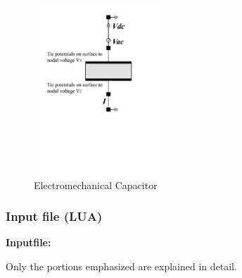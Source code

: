 \begin{figure}[htbp]
\centering
\includegraphics[trim = 1in 3.5in 2in 0.5in, clip, height = 2.5in]{fig/em_capacitor.pdf}
\caption{Electromechanical Capacitor}
\end{figure}

\clearpage
\subsubsection*{Input file (LUA)}
\begin{flushleft}
  \textbf{Inputfile:}
  \\
\end{flushleft}
\hspace{1in}
{\footnotesize
{}
}

\clearpage
Only the portions emphasized are explained in detail.

